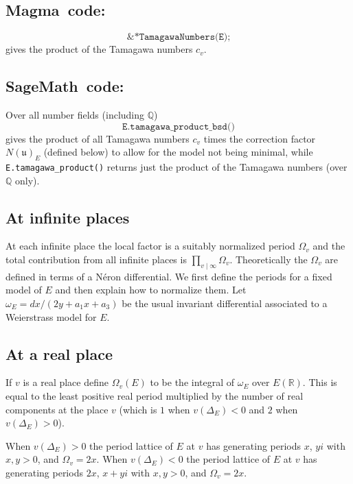 \documentclass{amsart}
\newcommand{\software}[1]{\textsf{#1}} %
\newcommand{\Sage}{\software{SageMath}{}\ }
\newcommand{\Magma}{\software{Magma}{}\ }
\newcommand\Q{\mathbb{Q}}
\newcommand\R{\mathbb{R}}
\begin{document}
\subsection{\Magma code:}\label{magma-4}

\[
\texttt{\&*TamagawaNumbers(E);}
\]
gives the product of the Tamagawa numbers \(c_v\).

\subsection{\Sage code:}\label{sage-4}

Over all number fields (including \(\Q\))
\[
\texttt{E.tamagawa\_product\_bsd()}
\]
gives the product of all Tamagawa numbers \(c_v\) times the correction
factor \(N(\mathfrak{u})_E\) (defined below) to allow for the model not
being minimal, while \texttt{E.tamagawa\_product()} returns
just the product of the Tamagawa numbers (over \(\Q\) only).

\subsection{At infinite places}\label{at-infinite-places}

At each infinite place the local factor is a suitably normalized period
\(\Omega_v\) and the total contribution from all infinite places is
\(\prod_{v\mid\infty}\Omega_v\). Theoretically the \(\Omega_v\) are
defined in terms of a N\'eron differential. We first define the periods
for a fixed model of \(E\) and then explain how to normalize them. Let
\(\omega_E = dx/(2y+a_1x+a_3)\) be the usual invariant differential
associated to a Weierstrass model for \(E\).

\subsection{At a real place}\label{at-a-real-place}

If \(v\) is a real place define \(\Omega_v(E)\) to be the integral of
\(\omega_E\) over \(E(\R)\). This is equal to the least positive real
period multiplied by the number of real components at the place \(v\)
(which is \(1\) when \(v(\Delta_E)<0\) and \(2\) when
\(v(\Delta_E)>0\)).

When \(v(\Delta_E)>0\) the period lattice of \(E\) at \(v\) has
generating periods \(x\), \(yi\) with \(x,y>0\), and \(\Omega_v=2x\).
When \(v(\Delta_E)<0\) the period lattice of \(E\) at \(v\) has
generating periods \(2x\), \(x+yi\) with \(x,y>0\), and \(\Omega_v=2x\).
\end{document}
